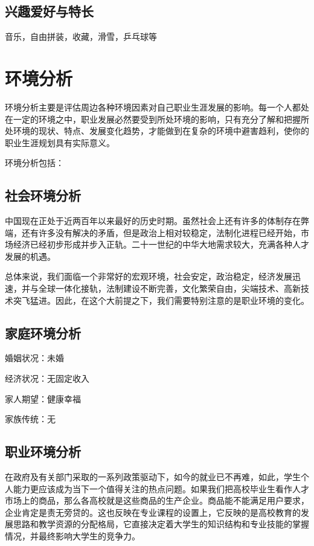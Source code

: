 \documentclass{article}
\begin{document}
\subsection{兴趣爱好与特长}
音乐，自由拼装，收藏，滑雪，乒乓球等
\par
\section{环境分析}
环境分析主要是评估周边各种环境因素对自己职业生涯发展的影响。每一个人都处在一定的环境之中，职业发展必然要受到所处环境的影响，只有充分了解和把握所处环境的现状、特点、发展变化趋势，才能做到在复杂的环境中避害趋利，使你的职业生涯规划具有实际意义。\par
环境分析包括：\par
\subsection{社会环境分析}
中国现在正处于近两百年以来最好的历史时期。虽然社会上还有许多的体制存在弊端，还有许多没有解决的矛盾，但是政治上相对较稳定，法制化进程已经开始，市场经济已经初步形成并步入正轨。二十一世纪的中华大地需求较大，充满各种人才发展的机遇。\par
总体来说，我们面临一个非常好的宏观环境，社会安定，政治稳定，经济发展迅速，并与全球一体化接轨，法制建设不断完善，文化繁荣自由，尖端技术、高新技术突飞猛进。因此，在这个大前提之下，我们需要特别注意的是职业环境的变化。\par
\subsection{家庭环境分析}
婚姻状况：未婚\par
经济状况：无固定收入\par
家人期望：健康幸福\par
家族传统：无\par
\subsection{职业环境分析}
在政府及有关部门采取的一系列政策驱动下，如今的就业已不再难，如此，学生个人能力更应该成为当下一个值得关注的热点问题。如果我们把高校毕业生看作人才市场上的商品，那么各高校就是这些商品的生产企业。商品能不能满足用户要求，企业肯定是责无旁贷的。这也反映在专业课程的设置上，它反映的是高校教育的发展思路和教学资源的分配格局，它直接决定着大学生的知识结构和专业技能的掌握情况，并最终影响大学生的竞争力。\par
\end{document}
